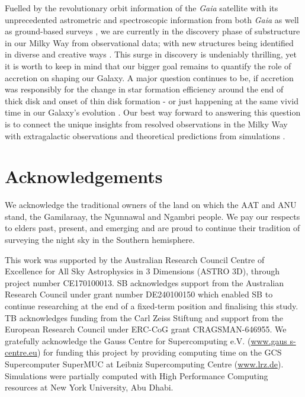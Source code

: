 \documentclass[fleqn,usenatbib]{mnras}
\begin{document}
Fuelled by the revolutionary orbit information of the \textit{Gaia} satellite \citep{Brown2016, Brown2018, Brown2021, Vallenari2023} with its unprecedented astrometric \citep{Lindegren2016, Lindegren2018, Lindegren2021a} and spectroscopic information from both \textit{Gaia} \citep{Katz2019, Katz2022} as well as ground-based surveys \citep[e.g.][]{SDSSDR17, Buder2021, Zhao2012, Conroy2019}, we are currently in the discovery phase of substructure in our Milky Way from observational data; with new structures being identified in diverse and creative ways \citep[e.g.][]{Naidu2021, Malhan2024}. This surge in discovery is undeniably thrilling, yet it is worth to keep in mind that our bigger goal remains to quantify the role of accretion on shaping our Galaxy. A major question continues to be, if accretion was responsibly for the change in star formation efficiency around the end of thick disk and onset of thin disk formation \citep{Conroy2022} - or just happening at the same vivid time in our Galaxy's evolution \citep[see the reviews by][for more extensive discussions]{Helmi2020, Deason2024}. Our best way forward to answering this question is to connect the unique insights from resolved observations in the Milky Way with extragalactic observations and theoretical predictions from simulations \citep[see e.g.][]{GECKOS2023}.

\section*{Acknowledgements}

We acknowledge the traditional owners of the land on which the AAT and ANU stand, the Gamilaraay, the Ngunnawal and Ngambri people. We pay our respects to elders past, present, and emerging and are proud to continue their tradition of surveying the night sky in the Southern hemisphere.

This work was supported by the Australian Research Council Centre of Excellence for All Sky Astrophysics in 3 Dimensions (ASTRO 3D), through project number CE170100013. SB acknowledges support from the Australian Research Council under grant number DE240100150 which enabled SB to continue researching at the end of a fixed-term position and finalising this study. TB acknowledges funding from the Carl Zeiss Stiftung and support from the European Research Council under ERC-CoG grant CRAGSMAN-646955. We gratefully acknowledge the Gauss Centre for Supercomputing e.V. (\url{www.gaus s-centre.eu}) for funding this project by providing computing time on the GCS Supercomputer SuperMUC at Leibniz Supercomputing Centre (\url{www.lrz.de}). Simulations were partially computed with High Performance Computing resources at New York University, Abu Dhabi.
\end{document}
